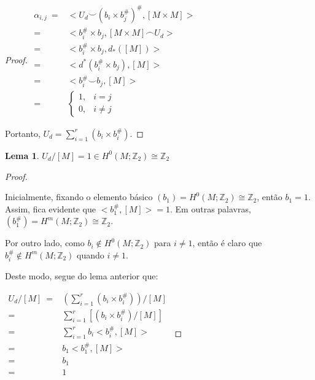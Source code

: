 \documentclass[12pt,oneside]{book} %
\newtheorem{lem}    {\hspace{0.5cm}Lema}[chapter]
\newcommand{\ds}{\displaystyle}
\newcommand{\Z}{\mathbb{Z}}
\newcommand{\ccup}{\smile}
\newcommand{\ccap}{\frown}
\begin{document}
\begin{proof}
	$ \begin{array}{rl}
		\alpha_{i,j} \ = & <U_{d}\ccup (b_{i}\times b_{j}^{\#})^{\#},[M\times M]> \\
		= & <b_{i}^{\#}\times b_{j},[M\times M]\ccap U_{d}> \\
		= & <b_{i}^{\#}\times b_{j},d_{*}([M])> \\
		= & <d^{*}(b_{i}^{\#}\times b_{j}),[M]> \\
		= & <b_{i}^{\#}\ccup b_{j},[M]> \\
		= & 	\left\{ \begin{array}{cl}
			1, & i=j \\
			0, & i\neq j
		\end{array} \right.
	\end{array} $ \newline
	
	\par Portanto, $U_{d}=\ds\sum_{i=1}^{r}(b_{i}\times b_{i}^{\#})$.
	
\end{proof}

\begin{lem}
	$U_{d}/[M]=1\in H^{0}(M;\Z_{2})\cong\Z_{2}$
\end{lem}

\begin{proof}
	
	\
	
	\par Inicialmente, fixando o elemento básico $(b_{1})=H^{0}(M;\Z_{2})\cong\Z_{2}$, então $b_{1}=1$. Assim, fica evidente que $<b_{1}^{\#},[M]>=1$. Em outras palavras, $(b_{1}^{\#})=H^{m}(M;\Z_{2})\cong\Z_{2}$.
	
	\par Por outro lado, como $b_{i}\notin H^{0}(M;\Z_{2})$ para $i\neq 1$, então é claro que $b_{i}^{\#}\notin H^{m}(M;\Z_{2})$ quando $i\neq 1$.
	
	\par Deste modo, segue do lema anterior que: \newline
	
	$ \begin{array}{rl}
		U_{d}/[M] \ = & \left( \ds\sum_{i=1}^{r}(b_{i}\times b_{i}^{\#}) \right)/[M] \\
		= & \ds\sum_{i=1}^{r}\left[ \left( b_{i}\times b_{i}^{\#} \right)/[M] \right] \\
		= & \ds\sum_{i=1}^{r}b_{i}<b_{i}^{\#},[M]> \\
		= & b_{1}<b_{1}^{\#},[M]> \\
		= & b_{1} \\
		= & 1
	\end{array} $
	
\end{proof}
\end{document}
